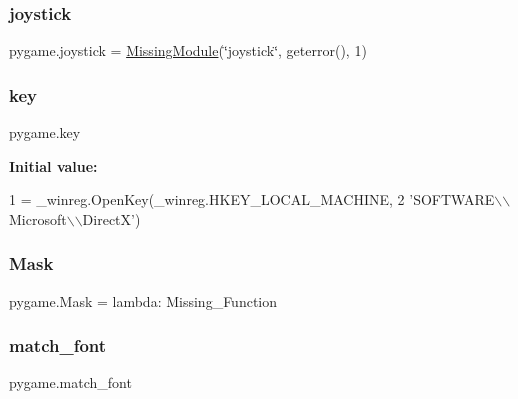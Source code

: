 \mbox{\label{namespacepygame_ad8248d6e9e058885a2bb86e449368df9}} 
\subsubsection{\texorpdfstring{joystick}{joystick}}
{\footnotesize\ttfamily pygame.\+joystick = \hyperlink{classpygame_1_1_missing_module}{Missing\+Module}(\char`\"{}joystick\char`\"{}, geterror(), 1)}

\mbox{\label{namespacepygame_a605356bb276b22993417ce95f178ab1d}} 
\subsubsection{\texorpdfstring{key}{key}}
{\footnotesize\ttfamily pygame.\+key}

{\bfseries Initial value\+:}
\begin{DoxyCode}
1 =  \_winreg.OpenKey(\_winreg.HKEY\_LOCAL\_MACHINE,
2                                       \textcolor{stringliteral}{'SOFTWARE\(\backslash\)\(\backslash\)Microsoft\(\backslash\)\(\backslash\)DirectX'})
\end{DoxyCode}
\mbox{\label{namespacepygame_afdbd3e54b27fd900191957f35330a52c}} 
\subsubsection{\texorpdfstring{Mask}{Mask}}
{\footnotesize\ttfamily pygame.\+Mask = lambda\+: Missing\+\_\+\+Function}

\mbox{\label{namespacepygame_a67d83ff8ac3e17b3ee0ed85f1afd844a}} 
\subsubsection{\texorpdfstring{match\+\_\+font}{match\_font}}
{\footnotesize\ttfamily pygame.\+match\+\_\+font}

\mbox{\label{namespacepygame_a4c8442fd66c9fb9c56c452e296a21eb7}} 
